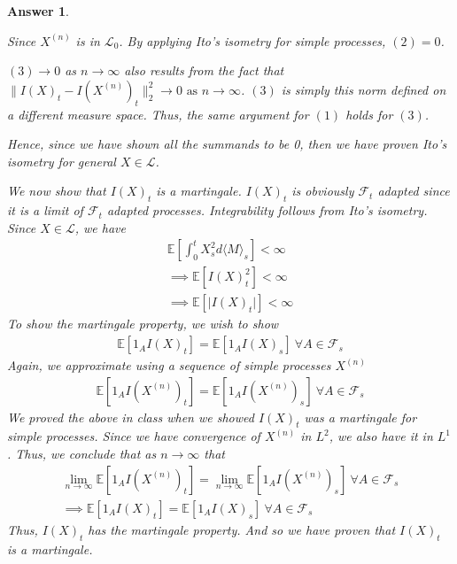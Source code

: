 \documentclass[12pt]{article}
\theoremstyle{colon}
\newtheorem*{answer}{Answer}
\begin{document}
\begin{answer}
\begin{enumerate}[label=\alph*)]
      Since $X^{(n)}$ is in $\mathcal{L}_0$. By applying Ito's isometry for simple processes, $(2) = 0$.

      $(3) \rightarrow 0$ as $n \rightarrow \infty$ also results from the fact that $\lVert I(X)_t - I(X^{(n)})_t \rVert_2^2 \rightarrow 0 \text{ as } n \rightarrow \infty$. $(3)$ is simply this norm defined on a different measure space. Thus, the same argument for $(1)$ holds for $(3)$.

      Hence, since we have shown all the summands to be 0, then we have proven Ito's isometry for general $X \in \mathcal{L}$.

      We now show that $I(X)_t$ is a martingale. $I(X)_t$ is obviously $\mathcal{F}_t$ adapted since it is a limit of $\mathcal{F}_t$ adapted processes. Integrability follows from Ito's isometry. Since $X \in \mathcal{L}$, we have
      \begin{gather*}
        \mathbb{E} [ \int_0^t X_s^2 d \langle M \rangle_s] < \infty \\
        \implies \mathbb{E} [I(X)_t^2] < \infty \\
        \implies \mathbb{E} [ \lvert I(X)_t \rvert] < \infty
      \end{gather*}
      To show the martingale property, we wish to show
      \begin{gather*}
        \mathbb{E}[1_A I(X)_t ] = \mathbb{E}[1_A I(X)_s ] \ \forall A \in \mathcal{F}_s
      \end{gather*}
      Again, we approximate using a sequence of simple processes $X^{(n)}$
      \begin{gather*}
        \mathbb{E}[1_A I(X^{(n)})_t ] = \mathbb{E}[1_A I(X^{(n)})_s ] \ \forall A \in \mathcal{F}_s
      \end{gather*}
      We proved the above in class when we showed $I(X)_t$ was a martingale for simple processes. Since we have convergence of $X^{(n)}$ in $L^2$, we also have it in $L^1$. Thus, we conclude that as $n \rightarrow \infty$ that
      \begin{gather*}
        \lim_{n \rightarrow \infty} \mathbb{E}[1_A I(X^{(n)})_t ] = \lim_{n \rightarrow \infty} \mathbb{E}[1_A I(X^{(n)})_s ] \ \forall A \in \mathcal{F}_s \\
        \implies \mathbb{E}[1_A I(X)_t ] = \mathbb{E}[1_A I(X)_s ] \ \forall A \in \mathcal{F}_s
      \end{gather*}
      Thus, $I(X)_t$ has the martingale property. And so we have proven that $I(X)_t$ is a martingale.


\end{enumerate}
\end{answer}
\end{document}
